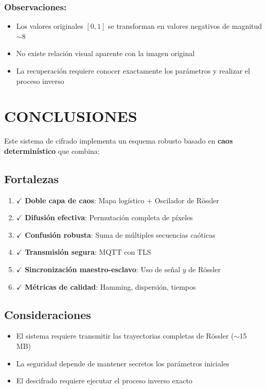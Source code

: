 \documentclass[12pt,a4paper]{article}
\begin{document}
\subsubsection*{Observaciones:}
\begin{itemize}
    \item Los valores originales $[0, 1]$ se transforman en valores negativos de magnitud $\sim 8$
    \item No existe relación visual aparente con la imagen original
    \item La recuperación requiere conocer exactamente los parámetros y realizar el proceso inverso
\end{itemize}

\section{CONCLUSIONES}

Este sistema de cifrado implementa un esquema robusto basado en \textbf{caos determinístico} que combina:

\subsection{Fortalezas}
\begin{enumerate}
    \item $\checkmark$ \textbf{Doble capa de caos}: Mapa logístico + Oscilador de Rössler
    \item $\checkmark$ \textbf{Difusión efectiva}: Permutación completa de píxeles
    \item $\checkmark$ \textbf{Confusión robusta}: Suma de múltiples secuencias caóticas
    \item $\checkmark$ \textbf{Transmisión segura}: MQTT con TLS
    \item $\checkmark$ \textbf{Sincronización maestro-esclavo}: Uso de señal $y$ de Rössler
    \item $\checkmark$ \textbf{Métricas de calidad}: Hamming, dispersión, tiempos
\end{enumerate}

\subsection{Consideraciones}
\begin{itemize}
    \item El sistema requiere transmitir las trayectorias completas de Rössler ($\sim$15 MB)
    \item La seguridad depende de mantener secretos los parámetros iniciales
    \item El descifrado requiere ejecutar el proceso inverso exacto
\end{itemize}
\end{document}
